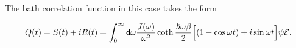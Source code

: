 The bath correlation function in this case takes the form

\begin{equation}
    Q(t) = S(t) + i R(t) = \int_{0}^{\infty} \mathsf{d} \omega \frac{J(\omega)}{\omega^2} 
    \coth \frac{\hbar \omega \beta}{2} \Bigl[ \left( 1 - \cos \omega t  \right) + i \sin \omega 
    t \Bigr] \psi \mathcal{E} .
\end{equation}